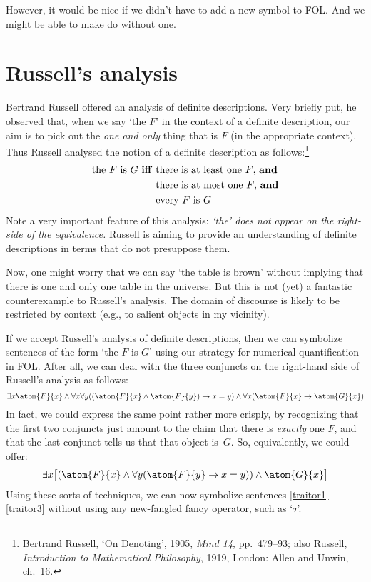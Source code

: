 However, it would be nice if we didn't have to add a new symbol to FOL. And we might be able to make do without one.

\section{Russell's analysis}
Bertrand Russell offered an analysis of definite descriptions. Very briefly put, he observed that, when we say `the $F$' in the context of a definite description, our aim is to pick out the \emph{one and only} thing that is $F$ (in the appropriate context). Thus Russell analysed the notion of a definite description as follows:\footnote{Bertrand Russell, `On Denoting', 1905, \emph{Mind 14}, pp.\ 479--93; also Russell, \emph{Introduction to Mathematical Philosophy}, 1919, London: Allen and Unwin, ch.\ 16.}
	\begin{align*}
		\text{the $F$ is $G$ \textbf{iff} }&\text{there is at least one $F$, \emph{and}}\\
	&\text{there is at most one $F$, \emph{and}}\\	
	&\text{every $F$ is $G$}
\end{align*}
Note a very important feature of this analysis: \emph{`the' does not appear on the right-side of the equivalence.} Russell is aiming to provide an understanding of definite descriptions in terms that do not presuppose them.

Now, one might worry that we can say `the table is brown' without implying that there is one and only one table in the universe. But this is not (yet) a fantastic counterexample to Russell's analysis. The domain of discourse is likely to be restricted by context (e.g., to salient objects in my vicinity).

If we accept Russell's analysis of definite descriptions, then we can symbolize sentences of the form `the $F$ is $G$' using our strategy for numerical quantification in FOL. After all, we can deal with the three conjuncts on the right-hand side of Russell's analysis as follows:
	$$\exists x \atom{F}{x} \eand \forall x \forall y ((\atom{F}{x} \eand \atom{F}{y}) \eif x = y) \eand \forall x (\atom{F}{x} \eif \atom{G}{x})$$
In fact, we could express the same point rather more crisply, by recognizing that the first two conjuncts just amount to the claim that there is \emph{exactly} one $F$, and that the last conjunct tells us that that object is~$G$. So, equivalently, we could offer:
	$$\exists x \bigl[(\atom{F}{x} \eand \forall y (\atom{F}{y} \eif x = y)) \eand \atom{G}{x}\bigr]$$
Using these sorts of techniques, we can now symbolize sentences \ref{traitor1}--\ref{traitor3} without using any new-fangled fancy operator, such as `$\maththe$'.


